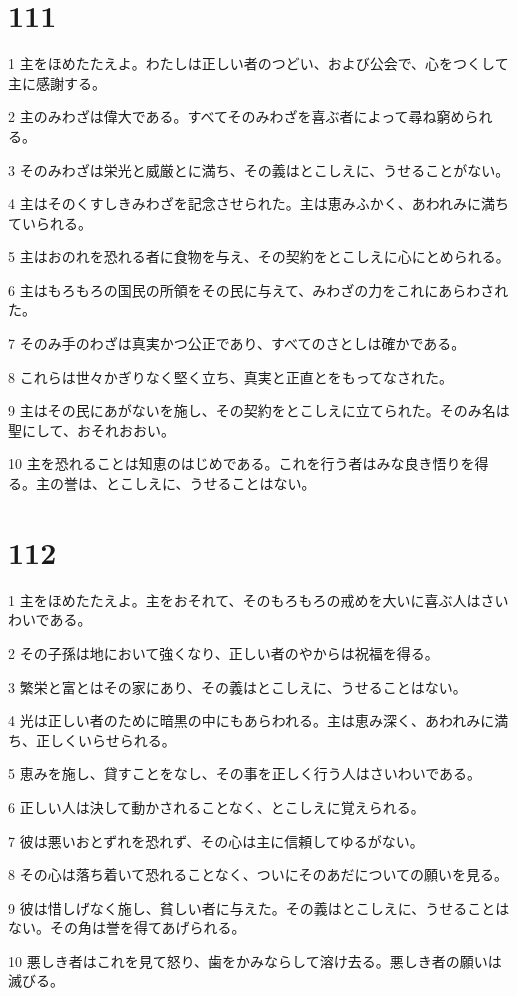 \chapter{111}

\par 1 主をほめたたえよ。わたしは正しい者のつどい、および公会で、心をつくして主に感謝する。
\par 2 主のみわざは偉大である。すべてそのみわざを喜ぶ者によって尋ね窮められる。
\par 3 そのみわざは栄光と威厳とに満ち、その義はとこしえに、うせることがない。
\par 4 主はそのくすしきみわざを記念させられた。主は恵みふかく、あわれみに満ちていられる。
\par 5 主はおのれを恐れる者に食物を与え、その契約をとこしえに心にとめられる。
\par 6 主はもろもろの国民の所領をその民に与えて、みわざの力をこれにあらわされた。
\par 7 そのみ手のわざは真実かつ公正であり、すべてのさとしは確かである。
\par 8 これらは世々かぎりなく堅く立ち、真実と正直とをもってなされた。
\par 9 主はその民にあがないを施し、その契約をとこしえに立てられた。そのみ名は聖にして、おそれおおい。
\par 10 主を恐れることは知恵のはじめである。これを行う者はみな良き悟りを得る。主の誉は、とこしえに、うせることはない。

\chapter{112}

\par 1 主をほめたたえよ。主をおそれて、そのもろもろの戒めを大いに喜ぶ人はさいわいである。
\par 2 その子孫は地において強くなり、正しい者のやからは祝福を得る。
\par 3 繁栄と富とはその家にあり、その義はとこしえに、うせることはない。
\par 4 光は正しい者のために暗黒の中にもあらわれる。主は恵み深く、あわれみに満ち、正しくいらせられる。
\par 5 恵みを施し、貸すことをなし、その事を正しく行う人はさいわいである。
\par 6 正しい人は決して動かされることなく、とこしえに覚えられる。
\par 7 彼は悪いおとずれを恐れず、その心は主に信頼してゆるがない。
\par 8 その心は落ち着いて恐れることなく、ついにそのあだについての願いを見る。
\par 9 彼は惜しげなく施し、貧しい者に与えた。その義はとこしえに、うせることはない。その角は誉を得てあげられる。
\par 10 悪しき者はこれを見て怒り、歯をかみならして溶け去る。悪しき者の願いは滅びる。

